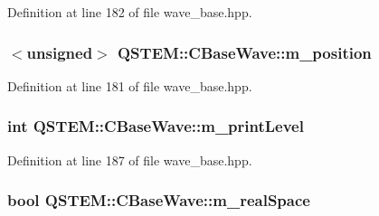 Definition at line 182 of file wave\-\_\-base.\-hpp.

\hypertarget{class_q_s_t_e_m_1_1_c_base_wave_a51410242069752a7e1e506d57a331543}{
\subsubsection[{m\-\_\-position}]{$<$unsigned$>$ Q\-S\-T\-E\-M\-::\-C\-Base\-Wave\-::m\-\_\-position\hspace{0.3cm}{\ttfamily [protected]}}}\label{class_q_s_t_e_m_1_1_c_base_wave_a51410242069752a7e1e506d57a331543}


Definition at line 181 of file wave\-\_\-base.\-hpp.

\hypertarget{class_q_s_t_e_m_1_1_c_base_wave_a4373beb7769798250b59ef44f57bf9d3}{
\subsubsection[{m\-\_\-print\-Level}]{\setlength{\rightskip}{0pt plus 5cm}int Q\-S\-T\-E\-M\-::\-C\-Base\-Wave\-::m\-\_\-print\-Level\hspace{0.3cm}{\ttfamily [protected]}}}\label{class_q_s_t_e_m_1_1_c_base_wave_a4373beb7769798250b59ef44f57bf9d3}


Definition at line 187 of file wave\-\_\-base.\-hpp.

\hypertarget{class_q_s_t_e_m_1_1_c_base_wave_aeaa99c25f2184ccb5142d6204c77059b}{
\subsubsection[{m\-\_\-real\-Space}]{\setlength{\rightskip}{0pt plus 5cm}bool Q\-S\-T\-E\-M\-::\-C\-Base\-Wave\-::m\-\_\-real\-Space\hspace{0.3cm}{\ttfamily [protected]}}}\label{class_q_s_t_e_m_1_1_c_base_wave_aeaa99c25f2184ccb5142d6204c77059b}


